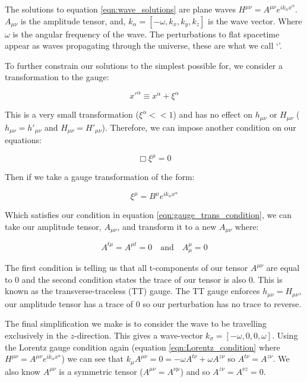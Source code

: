 The solutions to equation \ref{eqn:wave_solutions} are plane waves
$H^{\mu \nu} = A^{\mu \nu} e^{i k_\alpha x^{\alpha}}$. $A_{\mu \nu}$ is the amplitude tensor, and, $k_\alpha = [-\omega, k_x, k_y, k_z]$ is the wave vector. Where $\omega$ is the angular frequency of the wave. The perturbations to flat spacetime appear as waves propagating through the universe, these are what we call `\gws'.

To further constrain our solutions to the simplest possible for, we consider a transformation to the gauge:

\begin{equation}
   x'^{\alpha} \equiv x^{\alpha} + \xi^{\alpha}
   \label{eqn:gauge_transformation}
\end{equation}

This is a very small transformation ($\xi^{\alpha} << 1$) and has no effect on $h_{\mu \nu}$ or $H_{\mu \nu}$ ($h_{\mu \nu} = h'_{\mu \nu}$ and $H_{\mu \nu} = H'_{\mu \nu}$). Therefore, we can impose another condition on our equations:

\begin{equation}
   \Box \xi^{\mu} = 0
   \label{eqn:gauge_trans_condition}
\end{equation}

Then if we take a gauge transformation of the form:

\begin{equation}
   \xi^{\mu} = B^{\mu} e^{i k_\alpha x^{\alpha}}
   \label{eqn:gauge_transformation_form}
\end{equation}

Which satisfies our condition in equation \ref{eqn:gauge_trans_condition}, we can take our amplitude tensor, $A_{\mu \nu}$, and transform it to a new $A_{\mu \nu}$ where:

\begin{equation}
    A^{t \mu} = A^{\mu t} = 0 \quad \text{and} \quad A^\mu_\mu = 0
    \label{eqn:TT_conditions}
\end{equation}

The first condition is telling us that all t-components of our tensor $A^{\mu \nu}$ are equal to 0 and the second condition states the trace of our tensor is also 0. This is known as the transverse-traceless (TT) gauge. The TT gauge enforces $h_{\mu \nu} = H_{\mu \nu}$, our amplitude tensor has a trace of 0 so our perturbation has no trace to reverse.

The final simplification we make is to consider the wave to be travelling exclusively in the $z$-direction. This gives a wave-vector $k_\sigma = [-\omega, 0, 0, \omega]$. Using the Lorentz gauge condition again (equation \ref{eqn:Lorentz_condition} where $H^{\mu \nu} = A^{\mu \nu} e^{i k_\alpha x^{\alpha}}$) we can see that $k_\mu A^{\mu \nu} = 0 = -\omega A^{t \nu} + \omega A^{z \nu}$ so $A^{t \nu} = A^{z \nu}$. We also know $A^{\mu \nu}$
is a symmetric tensor ($A^{\mu \nu} = A^{\nu \mu}$) and so $A^{z \nu} = A^{\nu z} = 0$.

